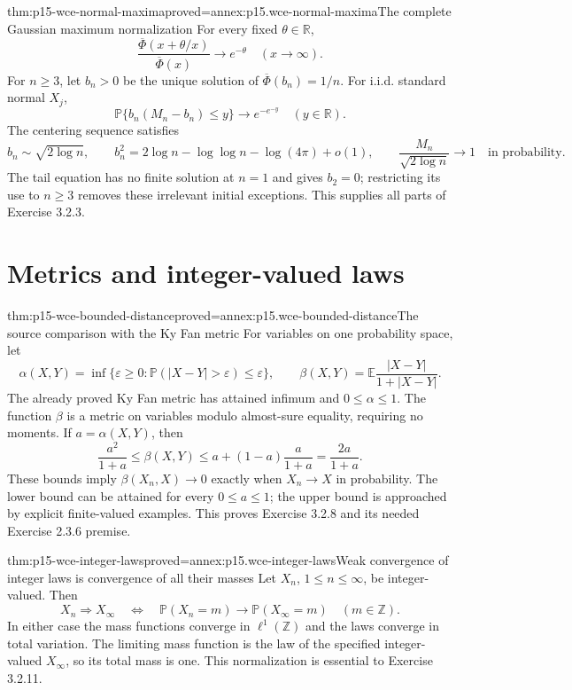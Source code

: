 \begin{hbtheorem}{thm:p15-wce-normal-maxima}{proved=annex:p15.wce-normal-maxima}{The complete Gaussian maximum normalization}
For every fixed \(\theta\in\mathbb R\),
\[
 \frac{\overline\Phi(x+\theta/x)}{\overline\Phi(x)}
                                    \longrightarrow e^{-\theta}
                                      \quad(x\to\infty).
 \]
For \(n\geq3\), let \(b_n>0\) be the unique solution of
\(\overline\Phi(b_n)=1/n\).
For i.i.d. standard normal \(X_j\),
\[
 \mathbb P\{b_n(M_n-b_n)\leq y\}\longrightarrow e^{-e^{-y}}
                                               \quad(y\in\mathbb R).
 \]
The centering sequence satisfies
\[
 b_n\sim\sqrt{2\log n},\qquad
 b_n^2=2\log n-\log\log n-\log(4\pi)+o(1),
 \qquad
 \frac{M_n}{\sqrt{2\log n}}\longrightarrow1
                                     \quad\text{in probability}.
 \]
The tail equation has no finite solution at \(n=1\) and gives
\(b_2=0\); restricting its use to \(n\geq3\) removes these
irrelevant initial exceptions. This supplies all parts of Exercise 3.2.3.
\end{hbtheorem}

\section{Metrics and integer-valued laws}
\label{sec:p15-wce-metrics-lattices}

\begin{hbtheorem}{thm:p15-wce-bounded-distance}{proved=annex:p15.wce-bounded-distance}{The source comparison with the Ky Fan metric}
For variables on one probability space, let
\[
 \alpha(X,Y)=\inf\{\varepsilon\geq0:
               \mathbb P(|X-Y|>\varepsilon)\leq\varepsilon\},
 \qquad
 \beta(X,Y)=\mathbb E\frac{|X-Y|}{1+|X-Y|}.
 \]
The already proved Ky Fan metric has attained infimum and
\(0\leq\alpha\leq1\).
The function \(\beta\) is a metric on variables modulo
almost-sure equality, requiring no moments.
If \(a=\alpha(X,Y)\), then
\[
 \frac{a^2}{1+a}\leq\beta(X,Y)
       \leq a+(1-a)\frac a{1+a}=\frac{2a}{1+a}.
 \]
These bounds imply
\(\beta(X_n,X)\to0\) exactly when \(X_n\to X\) in probability.
The lower bound can be attained for every \(0\leq a\leq1\);
the upper bound is approached by explicit finite-valued examples.
This proves Exercise 3.2.8 and its needed Exercise 2.3.6 premise.
\end{hbtheorem}

\begin{hbtheorem}{thm:p15-wce-integer-laws}{proved=annex:p15.wce-integer-laws}{Weak convergence of integer laws is convergence of all their masses}
Let \(X_n\), \(1\leq n\leq\infty\), be integer-valued.
Then
\[
 X_n\Rightarrow X_\infty
 \quad\Longleftrightarrow\quad
 \mathbb P(X_n=m)\longrightarrow\mathbb P(X_\infty=m)
                                      \quad(m\in\mathbb Z).
 \]
In either case the mass functions converge in \(\ell^1(\mathbb Z)\)
and the laws converge in total variation.
The limiting mass function is the law of the specified
integer-valued \(X_\infty\), so its total mass is one.
This normalization is essential to Exercise 3.2.11.
\end{hbtheorem}

